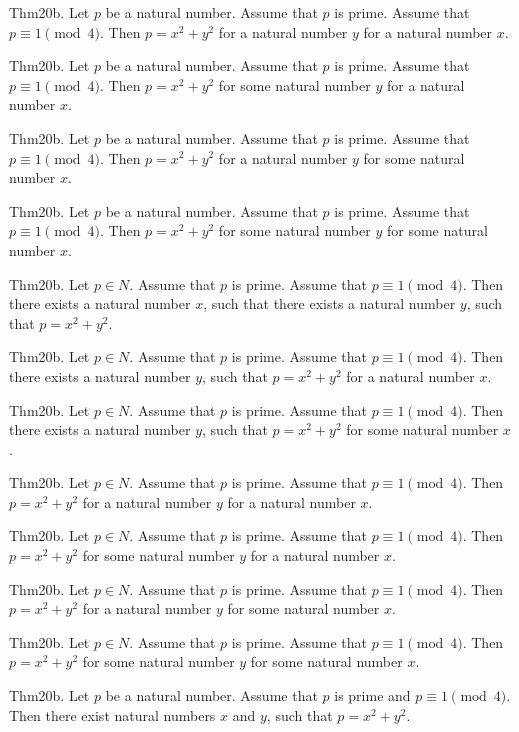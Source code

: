 \documentclass{article}
\begin{document}
Thm20b. Let $p$ be a natural number. Assume that $p$ is prime. Assume that $p \equiv 1 \pmod{ 4}$. Then $p = x ^{ 2}+ y ^{ 2}$ for a natural number $y$ for a natural number $x$.

Thm20b. Let $p$ be a natural number. Assume that $p$ is prime. Assume that $p \equiv 1 \pmod{ 4}$. Then $p = x ^{ 2}+ y ^{ 2}$ for some natural number $y$ for a natural number $x$.

Thm20b. Let $p$ be a natural number. Assume that $p$ is prime. Assume that $p \equiv 1 \pmod{ 4}$. Then $p = x ^{ 2}+ y ^{ 2}$ for a natural number $y$ for some natural number $x$.

Thm20b. Let $p$ be a natural number. Assume that $p$ is prime. Assume that $p \equiv 1 \pmod{ 4}$. Then $p = x ^{ 2}+ y ^{ 2}$ for some natural number $y$ for some natural number $x$.

Thm20b. Let $p \in N$. Assume that $p$ is prime. Assume that $p \equiv 1 \pmod{ 4}$. Then there exists a natural number $x$, such that there exists a natural number $y$, such that $p = x ^{ 2}+ y ^{ 2}$.

Thm20b. Let $p \in N$. Assume that $p$ is prime. Assume that $p \equiv 1 \pmod{ 4}$. Then there exists a natural number $y$, such that $p = x ^{ 2}+ y ^{ 2}$ for a natural number $x$.

Thm20b. Let $p \in N$. Assume that $p$ is prime. Assume that $p \equiv 1 \pmod{ 4}$. Then there exists a natural number $y$, such that $p = x ^{ 2}+ y ^{ 2}$ for some natural number $x$.

Thm20b. Let $p \in N$. Assume that $p$ is prime. Assume that $p \equiv 1 \pmod{ 4}$. Then $p = x ^{ 2}+ y ^{ 2}$ for a natural number $y$ for a natural number $x$.

Thm20b. Let $p \in N$. Assume that $p$ is prime. Assume that $p \equiv 1 \pmod{ 4}$. Then $p = x ^{ 2}+ y ^{ 2}$ for some natural number $y$ for a natural number $x$.

Thm20b. Let $p \in N$. Assume that $p$ is prime. Assume that $p \equiv 1 \pmod{ 4}$. Then $p = x ^{ 2}+ y ^{ 2}$ for a natural number $y$ for some natural number $x$.

Thm20b. Let $p \in N$. Assume that $p$ is prime. Assume that $p \equiv 1 \pmod{ 4}$. Then $p = x ^{ 2}+ y ^{ 2}$ for some natural number $y$ for some natural number $x$.

Thm20b. Let $p$ be a natural number. Assume that $p$ is prime and $p \equiv 1 \pmod{ 4}$. Then there exist natural numbers $x$ and $y$, such that $p = x ^{ 2}+ y ^{ 2}$.
\end{document}
